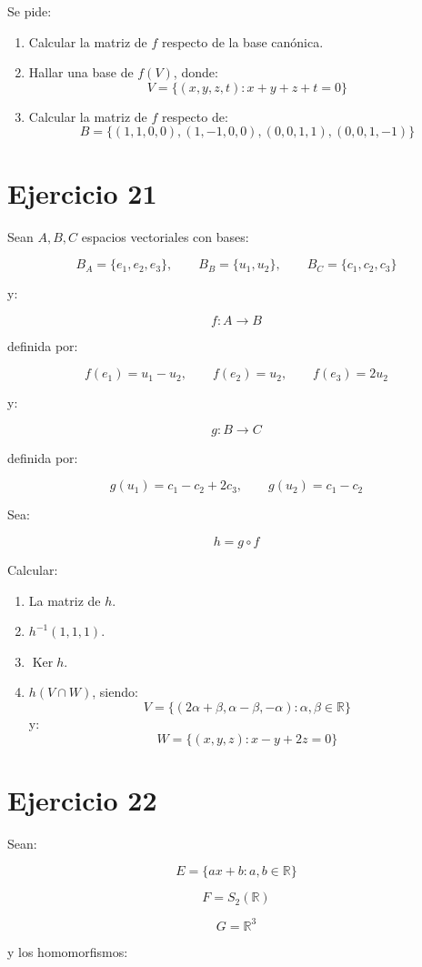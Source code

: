 \documentclass[11pt,a4paper]{article}
\newcommand{\R}{\mathbb{R}}
\newcommand{\Ker}{\operatorname{Ker}}
\begin{document}
Se pide:

\begin{enumerate}[label=\alph*)]
	\item Calcular la matriz de $f$ respecto de la base canónica.
	\item Hallar una base de $f(V)$, donde:
	\[
	V=
	\{(x,y,z,t):x+y+z+t=0\}
	\]
	\item Calcular la matriz de $f$ respecto de:
	\[
	B=
	\{(1,1,0,0),(1,-1,0,0),(0,0,1,1),(0,0,1,-1)\}
	\]
\end{enumerate}

\section{Ejercicio 21}
Sean $A,B,C$ espacios vectoriales con bases:

\[
B_A=\{e_1,e_2,e_3\},
\qquad
B_B=\{u_1,u_2\},
\qquad
B_C=\{c_1,c_2,c_3\}
\]

y:

\[
f:A\to B
\]

definida por:

\[
f(e_1)=u_1-u_2,
\qquad
f(e_2)=u_2,
\qquad
f(e_3)=2u_2
\]

y:

\[
g:B\to C
\]

definida por:

\[
g(u_1)=c_1-c_2+2c_3,
\qquad
g(u_2)=c_1-c_2
\]

Sea:

\[
h=g\circ f
\]

Calcular:

\begin{enumerate}[label=\alph*)]
	\item La matriz de $h$.
	\item $h^{-1}(1,1,1)$.
	\item $\Ker h$.
	\item $h(V\cap W)$, siendo:
	\[
	V=
	\{(2\alpha+\beta,\alpha-\beta,-\alpha):\alpha,\beta\in\R\}
	\]
	y:
	\[
	W=
	\{(x,y,z):x-y+2z=0\}
	\]
\end{enumerate}

\section{Ejercicio 22}
Sean:

\[
E=\{ax+b:a,b\in\R\}
\]

\[
F=S_2(\R)
\]

\[
G=\R^3
\]

y los homomorfismos:
\end{document}
